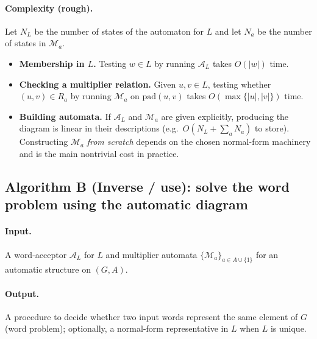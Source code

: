 \documentclass[11pt]{article}
\theoremstyle{definition}
\theoremstyle{plain}
\theoremstyle{remark}
\begin{document}
\paragraph{Complexity (rough).}
Let $N_L$ be the number of states of the automaton for $L$ and let $N_a$ be the number of states in $\mathcal M_a$.
\begin{itemize}[leftmargin=2em]
\item \textbf{Membership in $L$.} Testing $w\in L$ by running $\mathcal A_L$ takes $O(|w|)$ time.
\item \textbf{Checking a multiplier relation.} Given $u,v\in L$, testing whether $(u,v)\in R_a$ by running $\mathcal M_a$ on $\mathrm{pad}(u,v)$
takes $O(\max\{|u|,|v|\})$ time.
\item \textbf{Building automata.} If $\mathcal A_L$ and $\mathcal M_a$ are given explicitly, producing the diagram is linear in their descriptions
(e.g.\ $O(N_L+ \sum_a N_a)$ to store).
Constructing $\mathcal M_a$ \emph{from scratch} depends on the chosen normal-form machinery and is the main nontrivial cost in practice.
\end{itemize}

\subsection*{Algorithm B (Inverse / use): solve the word problem using the automatic diagram}
\paragraph{Input.}
A word-acceptor $\mathcal A_L$ for $L$ and multiplier automata $\{\mathcal M_a\}_{a\in A\cup\{1\}}$
for an automatic structure on $(G,A)$.

\paragraph{Output.}
A procedure to decide whether two input words represent the same element of $G$ (word problem);
optionally, a normal-form representative in $L$ when $L$ is unique.
\end{document}
